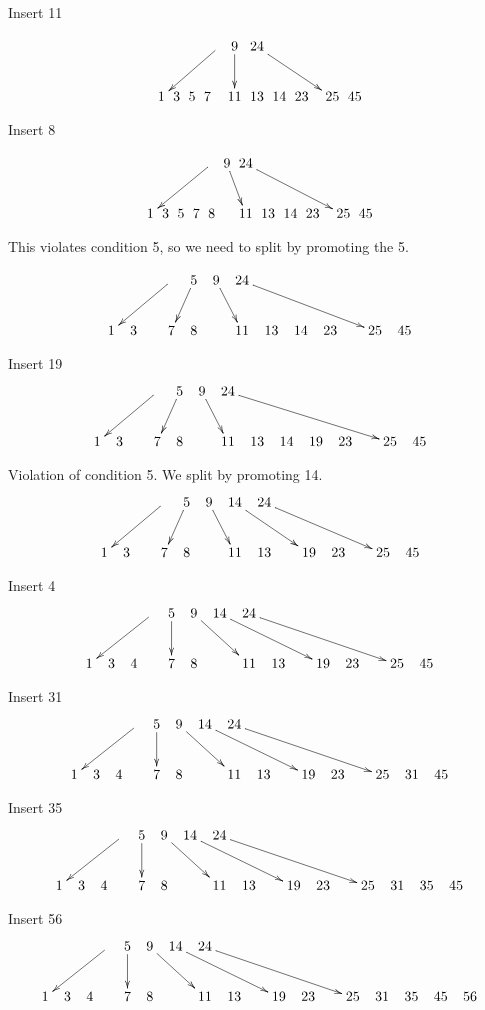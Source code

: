 \documentclass[a4paper]{article}
\begin{document}
Insert 11

$$\xymatrix @C=0pt {
  &  &  &   &  \ar[dllll] & 9 \ar[d] &  24 \ar[drrrr]  & \\
1 & 3 & 5 & 7 &   & 11 & 13 & 14 & 23 &  & 25 & 45 \\
}$$

Insert 8

$$\xymatrix @C=0pt {
  &  &  &   &  \ar[dllll] & 9 \ar[dr] &  24 \ar[drrrrr] & \\
1 & 3 & 5 & 7 & 8 &   & 11 & 13 & 14 & 23 &  & 25 & 45 \\
}$$

This violates condition 5, so we need to split by promoting the 5.

$$\xymatrix @C=5pt {
  &  &  &  \ar[dlll] &  5 \ar[dl] & 9 \ar[dr] &  24 \ar[drrrrr] & \\
1 & 3 &  & 7 & 8 &   & 11 & 13 & 14 & 23 &  & 25 & 45 \\
}$$

Insert 19
$$\xymatrix @C=5pt {
  &  &  &  \ar[dlll] &  5 \ar[dl] & 9 \ar[dr] &  24 \ar[drrrrrr] & \\
1 & 3 &  & 7 & 8 &   & 11 & 13 & 14 & 19 & 23 &  & 25 & 45 \\
}$$

Violation of condition 5.  We split by promoting 14.
$$\xymatrix @C=5pt {
  &  &  &  \ar[dlll] &  5 \ar[dl] & 9 \ar[dr] & 14 \ar[drrr] &  24 \ar[drrrrr] & \\
1 & 3 &  & 7 & 8 &   & 11 & 13 &  & 19 & 23 &  & 25 & 45 \\
}$$

Insert 4
$$\xymatrix @C=5pt {
  &  &  &  \ar[dlll] &  5 \ar[d] & 9 \ar[drr] & 14 \ar[drrrr] &  24 \ar[drrrrrr] & \\
1 & 3 & 4 &    & 7 & 8 &   & 11 & 13 &  & 19 & 23 &  & 25 & 45 \\
}$$

Insert 31
$$\xymatrix @C=5pt {
  &  &  &  \ar[dlll] &  5 \ar[d] & 9 \ar[drr] & 14 \ar[drrrr] &  24 \ar[drrrrrr] & \\
1 & 3 & 4 &    & 7 & 8 &   & 11 & 13 &  & 19 & 23 &  & 25 & 31 & 45 \\
}$$

Insert 35
$$\xymatrix @C=5pt {
  &  &  &  \ar[dlll] &  5 \ar[d] & 9 \ar[drr] & 14 \ar[drrrr] &  24 \ar[drrrrrr] & \\
1 & 3 & 4 &    & 7 & 8 &   & 11 & 13 &  & 19 & 23 &  & 25 & 31 & 35 & 45 \\
}$$

Insert 56
$$\xymatrix @C=5pt {
  &  &  &  \ar[dlll] &  5 \ar[d] & 9 \ar[drr] & 14 \ar[drrrr] &  24 \ar[drrrrrr] & \\
1 & 3 & 4 &    & 7 & 8 &   & 11 & 13 &  & 19 & 23 &  & 25 & 31 & 35 & 45 & 56 \\
}$$
\end{document}
